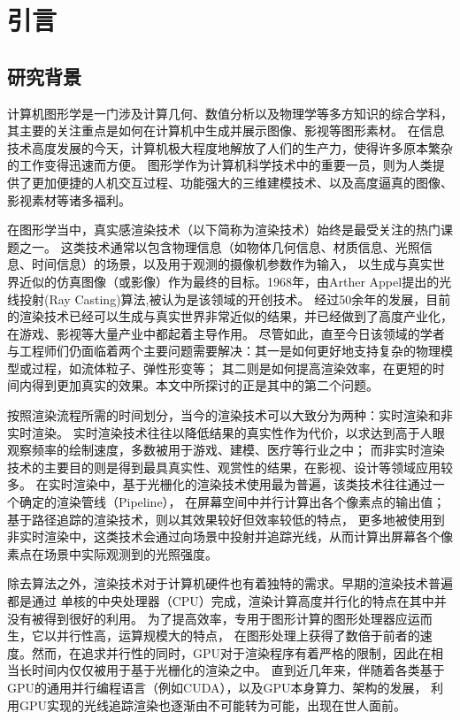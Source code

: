 \chapter{引言}
\label{cha:introduction}

\section{研究背景}

计算机图形学是一门涉及计算几何、数值分析以及物理学等多方知识的综合学科，其主要的关注重点是如何在计算机中生成并展示图像、影视等图形素材。
在信息技术高度发展的今天，计算机极大程度地解放了人们的生产力，使得许多原本繁杂的工作变得迅速而方便。
图形学作为计算机科学技术中的重要一员，则为人类提供了更加便捷的人机交互过程、功能强大的三维建模技术、以及高度逼真的图像、影视素材等诸多福利。

在图形学当中，真实感渲染技术（以下简称为渲染技术）始终是最受关注的热门课题之一。
这类技术通常以包含物理信息（如物体几何信息、材质信息、光照信息、时间信息）的场景，以及用于观测的摄像机参数作为输入，
以生成与真实世界近似的仿真图像（或影像）作为最终的目标。1968年，由Arther Appel提出的光线投射(Ray Casting)算法\cite{???},被认为是该领域的开创技术。
经过50余年的发展，目前的渲染技术已经可以生成与真实世界非常近似的结果，并已经做到了高度产业化，在游戏、影视等大量产业中都起着主导作用。
尽管如此，直至今日该领域的学者与工程师们仍面临着两个主要问题需要解决：其一是如何更好地支持复杂的物理模型或过程，如流体粒子、弹性形变等；
其二则是如何提高渲染效率，在更短的时间内得到更加真实的效果。本文中所探讨的正是其中的第二个问题。

按照渲染流程所需的时间划分，当今的渲染技术可以大致分为两种：实时渲染和非实时渲染。
实时渲染技术往往以降低结果的真实性作为代价，以求达到高于人眼观察频率的绘制速度，多数被用于游戏、建模、医疗等行业之中；
而非实时渲染技术的主要目的则是得到最具真实性、观赏性的结果，在影视、设计等领域应用较多。
在实时渲染中，基于光栅化的渲染技术使用最为普遍，该类技术往往通过一个确定的渲染管线（Pipeline），
在屏幕空间中并行计算出各个像素点的输出值；基于路径追踪的渲染技术，则以其效果较好但效率较低的特点，
更多地被使用到非实时渲染中，这类技术会通过向场景中投射并追踪光线，从而计算出屏幕各个像素点在场景中实际观测到的光照强度。

除去算法之外，渲染技术对于计算机硬件也有着独特的需求。早期的渲染技术普遍都是通过
单核的中央处理器（CPU）完成，渲染计算高度并行化的特点在其中并没有被得到很好的利用。
为了提高效率，专用于图形计算的图形处理器应运而生，它以并行性高，运算规模大的特点，
在图形处理上获得了数倍于前者的速度。然而，在追求并行性的同时，GPU对于渲染程序有着严格的限制，因此在相当长时间内仅仅被用于基于光栅化的渲染之中。
直到近几年来，伴随着各类基于GPU的通用并行编程语言（例如CUDA），以及GPU本身算力、架构的发展，
利用GPU实现的光线追踪渲染也逐渐由不可能转为可能，出现在世人面前。

